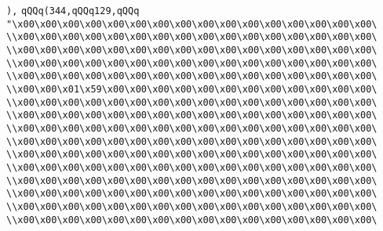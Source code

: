 \verb|),|\newline
\verb|qQQq(344,qQQq129,qQQq|\newline
\verb|"\x00\x00\x00\x00\x00\x00\x00\x00\x00\x00\x00\x00\x00\x00\x00\x00\|\newline
\verb|\\x00\x00\x00\x00\x00\x00\x00\x00\x00\x00\x00\x00\x00\x00\x00\x00\|\newline
\verb|\\x00\x00\x00\x00\x00\x00\x00\x00\x00\x00\x00\x00\x00\x00\x00\x00\|\newline
\verb|\\x00\x00\x00\x00\x00\x00\x00\x00\x00\x00\x00\x00\x00\x00\x00\x00\|\newline
\verb|\\x00\x00\x00\x00\x00\x00\x00\x00\x00\x00\x00\x00\x00\x00\x00\x00\|\newline
\verb|\\x00\x00\x01\x59\x00\x00\x00\x00\x00\x00\x00\x00\x00\x00\x00\x00\|\newline
\verb|\\x00\x00\x00\x00\x00\x00\x00\x00\x00\x00\x00\x00\x00\x00\x00\x00\|\newline
\verb|\\x00\x00\x00\x00\x00\x00\x00\x00\x00\x00\x00\x00\x00\x00\x00\x00\|\newline
\verb|\\x00\x00\x00\x00\x00\x00\x00\x00\x00\x00\x00\x00\x00\x00\x00\x00\|\newline
\verb|\\x00\x00\x00\x00\x00\x00\x00\x00\x00\x00\x00\x00\x00\x00\x00\x00\|\newline
\verb|\\x00\x00\x00\x00\x00\x00\x00\x00\x00\x00\x00\x00\x00\x00\x00\x00\|\newline
\verb|\\x00\x00\x00\x00\x00\x00\x00\x00\x00\x00\x00\x00\x00\x00\x00\x00\|\newline
\verb|\\x00\x00\x00\x00\x00\x00\x00\x00\x00\x00\x00\x00\x00\x00\x00\x00\|\newline
\verb|\\x00\x00\x00\x00\x00\x00\x00\x00\x00\x00\x00\x00\x00\x00\x00\x00\|\newline
\verb|\\x00\x00\x00\x00\x00\x00\x00\x00\x00\x00\x00\x00\x00\x00\x00\x00\|\newline
\verb|\\x00\x00\x00\x00\x00\x00\x00\x00\x00\x00\x00\x00\x00\x00\x00\x00\|\newline

